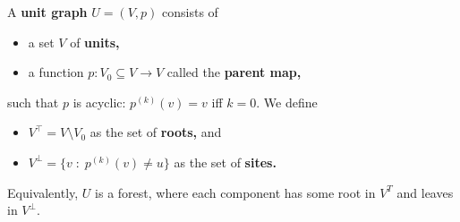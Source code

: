 \begin{itemize}

\begin{definition}
  A \textbf{unit graph} $U = (V, p)$ consists of
  \begin{itemize}
    \item a set $V$ of \textbf{units,}
    \item a function $p: V_{0} \subseteq V \to V$ called the \textbf{parent map,}
  \end{itemize}
  such that $p$ is acyclic: $p^{(k)}(v) = v$ iff $k = 0$. We define
  \begin{itemize}
  \item $V^{\top} = V \setminus V_{0}$ as the set of \textbf{roots,} and
  \item $V^{\bot} = \{v \;:\; p^{(k)}(v) \neq u \}$ as the set of \textbf{sites.}
  \end{itemize}
  Equivalently, $U$ is a forest, where each component has some root in $V^{T}$ and leaves in $V^{\bot}.$


\end{definition}
\end{itemize}

